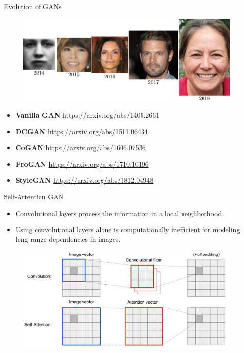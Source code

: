 \begin{frame}{Evolution of GANs}
	\begin{figure}
		\centering
		\includegraphics[width=\linewidth]{figs/gan_evolution}
	\end{figure}
	\begin{itemize}
		\item \textbf{Vanilla GAN} \href{https://arxiv.org/abs/1406.2661}{https://arxiv.org/abs/1406.2661}
		\item \textbf{DCGAN} \href{https://arxiv.org/abs/1511.06434}{https://arxiv.org/abs/1511.06434}
		\item \textbf{CoGAN} \href{https://arxiv.org/abs/1606.07536}{https://arxiv.org/abs/1606.07536}
		\item \textbf{ProGAN} \href{https://arxiv.org/abs/1710.10196}{https://arxiv.org/abs/1710.10196} 
		\item \textbf{StyleGAN} \href{https://arxiv.org/abs/1812.04948}{https://arxiv.org/abs/1812.04948}
	\end{itemize}
\end{frame}
\begin{frame}{Self-Attention GAN}
	\begin{itemize}
		\item Convolutional layers process the information in a local neighborhood.
		\item Using convolutional layers alone is computationally inefficient for modeling long-range dependencies in images.
	\end{itemize}
	\begin{figure}
		\centering
		\includegraphics[width=0.9\linewidth]{figs/conv-vs-sa}
	\end{figure}
\end{frame}
